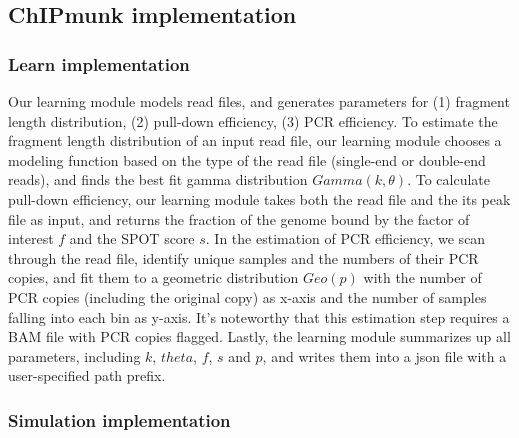 \documentclass[12pt]{article}
\begin{document}
\subsection*{ChIPmunk implementation}

\subsubsection*{Learn implementation}
Our learning module models read files, and generates parameters for 
(1) fragment length distribution, (2) pull-down efficiency, (3) PCR efficiency.
To estimate the fragment length distribution of an input read file,
our learning module chooses a modeling function based on the type of the read file (single-end or double-end reads),
and finds the best fit gamma distribution $Gamma (k, \theta)$.
To calculate pull-down efficiency, our learning module takes both the read file and the its peak file as input,
and returns the fraction of the genome bound by the factor of interest $f$ and the SPOT score $s$.
In the estimation of PCR efficiency, we scan through the read file, 
identify unique samples and the numbers of their PCR copies,
and fit them to a geometric distribution $Geo(p)$ with the number of PCR copies (including the original copy)
as x-axis and the number of samples falling into each bin as y-axis.
It’s noteworthy that this estimation step requires a BAM file with PCR copies flagged. Lastly, the learning module summarizes up all parameters, including $k$, $theta$, $f$, $s$ and $p$, and writes them into a json file with a user-specified path prefix.

\subsubsection*{Simulation implementation}



\end{document}
